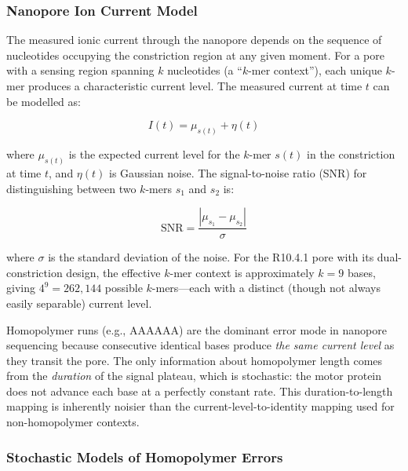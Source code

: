 \subsubsection{Nanopore Ion Current Model}
\label{subsubsec:longread:current-model}

The measured ionic current through the nanopore depends on the sequence of nucleotides occupying the constriction region at any given moment. For a pore with a sensing region spanning $k$ nucleotides (a ``$k$-mer context''), each unique $k$-mer produces a characteristic current level. The measured current at time $t$ can be modelled as:

\begin{equation}
I(t) = \mu_{s(t)} + \eta(t)
\label{eq:longread:current-model}
\end{equation}

where $\mu_{s(t)}$ is the expected current level for the $k$-mer $s(t)$ in the constriction at time $t$, and $\eta(t)$ is Gaussian noise. The signal-to-noise ratio (SNR) for distinguishing between two $k$-mers $s_1$ and $s_2$ is:

\begin{equation}
\text{SNR} = \frac{|\mu_{s_1} - \mu_{s_2}|}{\sigma}
\label{eq:longread:snr}
\end{equation}

where $\sigma$ is the standard deviation of the noise. For the R10.4.1 pore with its dual-constriction design, the effective $k$-mer context is approximately $k = 9$ bases, giving $4^9 = 262{,}144$ possible $k$-mers---each with a distinct (though not always easily separable) current level.

\begin{keyconcept}[title={Why Homopolymers Are Hard}]
Homopolymer runs (e.g., AAAAAA) are the dominant error mode in nanopore sequencing because consecutive identical bases produce \textit{the same current level} as they transit the pore. The only information about homopolymer length comes from the \textit{duration} of the signal plateau, which is stochastic: the motor protein does not advance each base at a perfectly constant rate. This duration-to-length mapping is inherently noisier than the current-level-to-identity mapping used for non-homopolymer contexts.
\end{keyconcept}


\subsubsection{Stochastic Models of Homopolymer Errors}
\label{subsubsec:longread:homopolymer}


